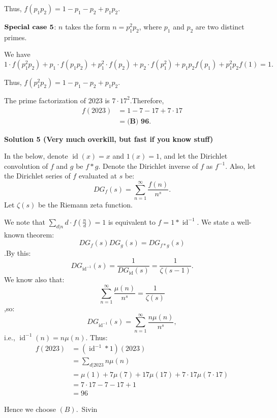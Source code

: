 \begin{enumerate}
 Thus, $f \left( p_1 p_2 \right) = 1 - p_1 - p_2 + p_1 p_2$.

 $\noindent \textbf{Special case 5}$: $n$ takes the form $n = p_1^2 p_2$, where $p_1$ and $p_2$ are two distinct primes.

 We have
 \[ 1 \cdot f \left( p_1^2 p_2 \right) + p_1 \cdot f \left( p_1 p_2 \right) + p_1^2 \cdot f \left( p_2 \right) + p_2 \cdot f \left( p_1^2 \right) + p_1 p_2 f \left( p_1 \right) + p_1^2 p_2 f \left( 1 \right) = 1. \]

 Thus, $f \left( p_1^2 p_2 \right) = 1 - p_1 - p_2 + p_1 p_2$.

 The prime factorization of 2023 is $7 \cdot 17^2$.Therefore,
 \begin{align*} f \left( 2023 \right) & = 1 - 7 - 17 + 7 \cdot 17 \\ & = \boxed{\textbf{(B) 96}}. \end{align*}





\textbf{Solution 5 (Very much overkill, but fast if you know stuff)}

In the below, denote $\operatorname{id}(x)=x$ and $1(x)=1$, and let the Dirichlet convolution of $f$ and $g$ be $f*g$. Denote the Dirichlet inverse of $f$ as $f^{-1}$. Also, let the Dirichlet series of $f$ evaluated at $s$ be:
 \[DG_f(s)=\sum_{n=1}^{\infty}\frac{f(n)}{n^s}.\]Let $\zeta(s)$ be the Riemann zeta function.

 We note that $\sum_{d|n}{d\cdot f\left(\frac{n}{d}\right)}=1$ is equivalent to $f=1*\operatorname{id}^{-1}$. We state a well-known theorem:
 \[DG_f(s)DG_g(s)=DG_{f*g}(s)\].By this:
 \[DG_{\operatorname{id}^{-1}}(s)=\frac{1}{DG_{\operatorname{id}}(s)}=\frac{1}{\zeta(s-1)}.\]We know also that:
 \[\sum_{n=1}^{\infty}\frac{\mu(n)}{n^s}=\frac{1}{\zeta(s)}\],so:
 \[DG_{\operatorname{id}^{-1}}(s)=\sum_{n=1}^{\infty}\frac{n\mu(n)}{n^s},\]i.e., $\operatorname{id}^{-1}(n)=n\mu(n).$ Thus:\begin{align*}f(2023)&=\left(\operatorname{id}^{-1}*1\right)(2023)\\&=\sum_{d|2023}{n\mu(n)}\\&=\mu(1)+7\mu(7)+17\mu(17)+7\cdot 17\mu(7\cdot 17)\\&= 7\cdot 17-7-17+1\\&=96\end{align*}


 Hence we choose $\boxed{(B)}$.~Sivin

 




\end{enumerate}
